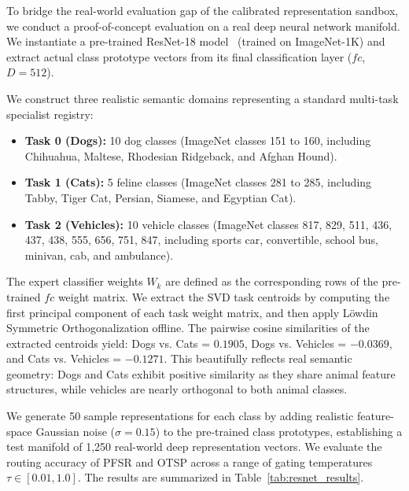 To bridge the real-world evaluation gap of the calibrated representation sandbox, we conduct a proof-of-concept evaluation on a real deep neural network manifold. We instantiate a pre-trained ResNet-18 model~\cite{he2016deep} (trained on ImageNet-1K) and extract actual class prototype vectors from its final classification layer ($fc$, $D=512$).

We construct three realistic semantic domains representing a standard multi-task specialist registry:
\begin{itemize}
    \item \textbf{Task 0 (Dogs):} 10 dog classes (ImageNet classes 151 to 160, including Chihuahua, Maltese, Rhodesian Ridgeback, and Afghan Hound).
    \item \textbf{Task 1 (Cats):} 5 feline classes (ImageNet classes 281 to 285, including Tabby, Tiger Cat, Persian, Siamese, and Egyptian Cat).
    \item \textbf{Task 2 (Vehicles):} 10 vehicle classes (ImageNet classes 817, 829, 511, 436, 437, 438, 555, 656, 751, 847, including sports car, convertible, school bus, minivan, cab, and ambulance).
\end{itemize}
The expert classifier weights $W_k$ are defined as the corresponding rows of the pre-trained $fc$ weight matrix. We extract the SVD task centroids by computing the first principal component of each task weight matrix, and then apply L{\"o}wdin Symmetric Orthogonalization offline. The pairwise cosine similarities of the extracted centroids yield: Dogs vs. Cats = $0.1905$, Dogs vs. Vehicles = $-0.0369$, and Cats vs. Vehicles = $-0.1271$. This beautifully reflects real semantic geometry: Dogs and Cats exhibit positive similarity as they share animal feature structures, while vehicles are nearly orthogonal to both animal classes.

We generate 50 sample representations for each class by adding realistic feature-space Gaussian noise ($\sigma = 0.15$) to the pre-trained class prototypes, establishing a test manifold of 1,250 real-world deep representation vectors. We evaluate the routing accuracy of PFSR and OTSP across a range of gating temperatures $\tau \in [0.01, 1.0]$. The results are summarized in Table~\ref{tab:resnet_results}.

